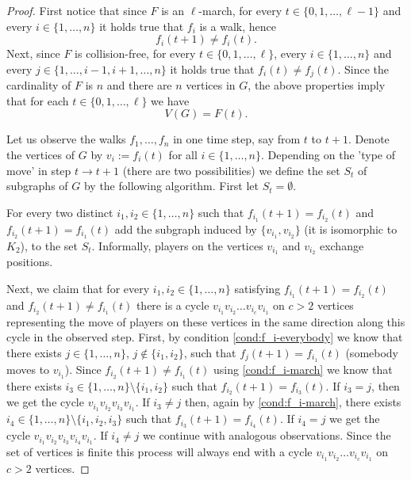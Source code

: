 \documentclass{article}
\begin{document}
\begin{proof}
    First notice that since $F$ is an $\ell$-march, for every $t\in \{0, 1, \ldots, \ell-1\}$ and every $i\in\{1,\ldots, n\}$ it holds true that $f_i$ is a walk, hence
    \begin{equation}\label{cond:f_i-march}
      f_i(t+1)\neq f_i(t).
    \end{equation}
    Next, since $F$ is collision-free, for every $t\in \{0, 1, \ldots, \ell\}$, every $i\in\{1,\ldots, n\}$ and every $j\in\{1,\ldots,i-1,i+1,\ldots,n\}$ it holds true that $f_i(t)\neq f_j(t)$. Since the cardinality of $F$ is $n$ and there are $n$ vertices in $G$, the above properties imply that for each $t\in \{0, 1, \ldots, \ell\}$ we have 
    \begin{equation}\label{cond:f_i-everybody}
    V(G)=F(t). 
    \end{equation}

    Let us observe the walks $f_1, \ldots, f_n$ in one time step, say from $t$ to $t+1$. Denote the vertices of $G$ by $v_i:=f_i(t)$ for all $i\in\{1,\ldots, n\}$. Depending on the 'type of move' in step $t\rightarrow t+1$ (there are two possibilities) we define the set $S_t$ of subgraphs of $G$ by the following algorithm. First let $S_t=\emptyset$.
    
    For every two distinct $i_1,i_2\in \{1,\ldots, n\}$ such that $f_{i_1}(t+1)=f_{i_2}(t)$ and $f_{i_2}(t+1)=f_{i_1}(t)$ add the subgraph induced by $\{v_{i_1},v_{i_2}\}$ (it is isomorphic to $K_2$), to the set $S_t$. Informally, players on the vertices $v_{i_1}$ and $v_{i_2}$ exchange positions.

    Next, we claim that for every $i_1,i_2 \in \{1,\ldots, n\}$ satisfying $f_{i_1}(t+1)=f_{i_2}(t)$ and $f_{i_2}(t+1)\neq f_{i_1}(t)$ there is a cycle $v_{i_1}v_{i_2}\ldots v_{i_c}v_{i_1}$ on $c>2$ vertices representing the move of players on these vertices in the same direction along this cycle in the observed step. First, by condition \eqref{cond:f_i-everybody} we know that there exists $j\in \{1,\ldots, n\}$, $j\not\in\{i_1,i_2\}$, such that $f_{j}(t+1)=f_{i_1}(t)$ (somebody moves to $v_{i_1}$). Since $f_{i_2}(t+1)\neq f_{i_1}(t)$ using \eqref{cond:f_i-march} we know that there exists $i_3\in \{1,\ldots, n\}\setminus\{i_1,i_2\}$ such that $f_{i_2}(t+1)=f_{i_3}(t)$. If $i_3=j$, then we get the cycle $v_{i_1}v_{i_2}v_{i_3}v_{i_1}$. If $i_3\neq j$ then, again by \eqref{cond:f_i-march}, there exists $i_4\in \{1,\ldots, n\}\setminus\{i_1,i_2,i_3\}$ such that $f_{i_3}(t+1)=f_{i_4}(t)$. If $i_4=j$ we get the cycle $v_{i_1}v_{i_2}v_{i_3}v_{i_4}v_{i_1}$. If $i_4\neq j$ we continue with analogous observations. Since the set of vertices is finite this process will always end with a cycle $v_{i_1}v_{i_2}\ldots v_{i_c}v_{i_1}$ on $c>2$ vertices.


\end{proof}
\end{document}
